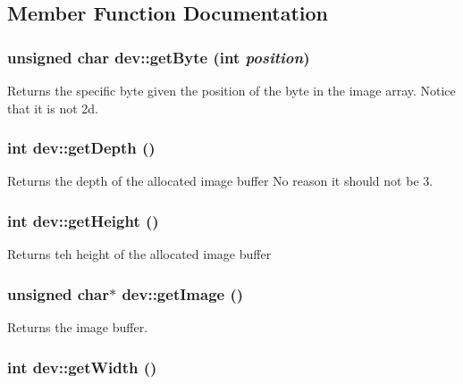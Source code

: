 \subsection{Member Function Documentation}
\hypertarget{classdev_a220ca2f10395d25b828e9d5e72feefb7}{
\subsubsection[{getByte}]{\setlength{\rightskip}{0pt plus 5cm}unsigned char dev::getByte (int {\em position})}}
\label{classdev_a220ca2f10395d25b828e9d5e72feefb7}
Returns the specific byte given the position of the byte in the image array. Notice that it is not 2d. \hypertarget{classdev_a676db2fb79a8b6ddf21527aafa44ddab}{
\subsubsection[{getDepth}]{\setlength{\rightskip}{0pt plus 5cm}int dev::getDepth ()}}
\label{classdev_a676db2fb79a8b6ddf21527aafa44ddab}
Returns the depth of the allocated image buffer No reason it should not be 3. \hypertarget{classdev_a760161504ea05e090293aff31c834634}{
\subsubsection[{getHeight}]{\setlength{\rightskip}{0pt plus 5cm}int dev::getHeight ()}}
\label{classdev_a760161504ea05e090293aff31c834634}
Returns teh height of the allocated image buffer \hypertarget{classdev_accda40f66947d00bc9fd294f47a187f6}{
\subsubsection[{getImage}]{\setlength{\rightskip}{0pt plus 5cm}unsigned char$\ast$ dev::getImage ()}}
\label{classdev_accda40f66947d00bc9fd294f47a187f6}
Returns the image buffer. \hypertarget{classdev_adc3b057042e6069d8e2432c48418c173}{
\subsubsection[{getWidth}]{\setlength{\rightskip}{0pt plus 5cm}int dev::getWidth ()}}
